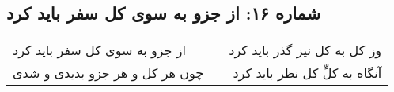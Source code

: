 \begin{center}
\section*{شماره ۱۶: از جزو به سوی کل سفر باید کرد}
\label{sec:016}
\begin{longtable}{l p{0.5cm} r}
از جزو به سوی کل سفر باید کرد
&&
وز کل به کل نیز گذر باید کرد
\\
چون هر کل و هر جزو بدیدی و شدی
&&
آنگاه به کلِّ کل نظر باید کرد
\\
\end{longtable}
\end{center}
